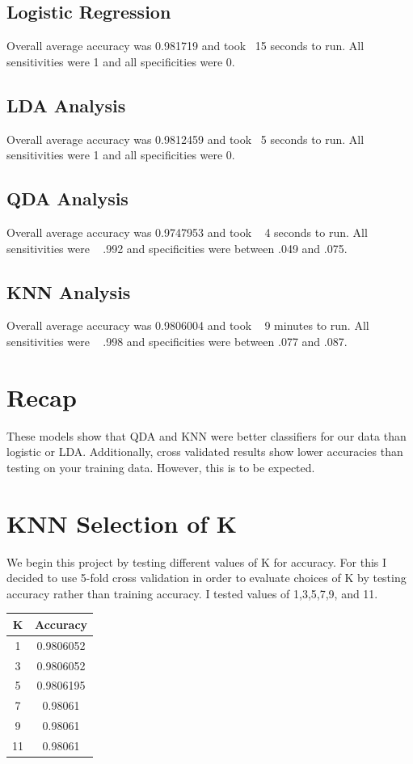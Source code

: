 \documentclass[10pt,twocolumn,letterpaper]{article}
\begin{document}
\subsection{Logistic Regression}
Overall average accuracy was 0.981719 and took ~15 seconds to run. All sensitivities were 1 and all specificities were 0.

\subsection{LDA Analysis}
Overall average accuracy was 0.9812459  and took ~5 seconds to run. All sensitivities were 1 and all specificities were 0.

\subsection{QDA Analysis}
Overall average accuracy was 0.9747953 and took ~ 4 seconds to run. All sensitivities were ~ .992 and specificities were between .049 and .075.

\subsection{KNN Analysis}
Overall average accuracy was 0.9806004 and took ~ 9 minutes to run. All sensitivities were ~ .998 and specificities were between .077 and .087.


\section{Recap}
These models show that QDA and KNN were better classifiers for our data than logistic or LDA. Additionally, cross validated results show lower accuracies than testing on your training data. However, this is to be expected.




\section{KNN Selection of K}
We begin this project by testing different values of K for accuracy. For this I decided to use 5-fold cross validation in order to evaluate choices of K by testing accuracy rather than training accuracy. I tested values of 1,3,5,7,9, and 11.
\begin{center}
	\begin{tabular}{ |c|c| } 
		\hline
		K & Accuracy \\ 
		\hline
		1 & 0.9806052 \\
		\hline
		3 & 0.9806052\\ 
		\hline
		5 & 0.9806195\\ 
		\hline
		7 & 0.98061\\ 
		\hline
		9 & 0.98061\\ 
		\hline
		11 & 0.98061\\ 
		\hline
	\end{tabular}
\end{center}
\end{document}

